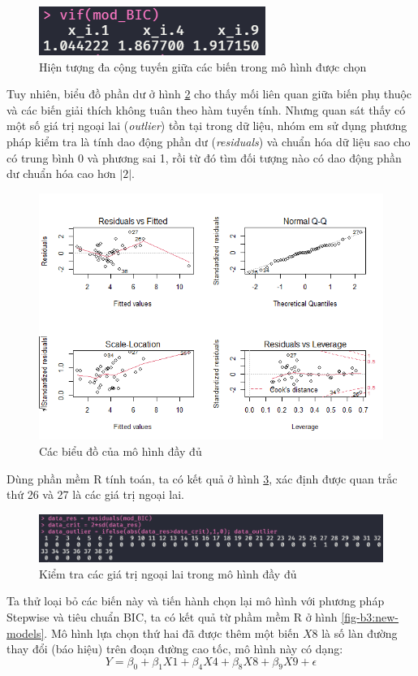 \begin{figure}[H]
	\centering
	\includegraphics[width=0.35\linewidth]{images/B3/model-bic-vif}
	\caption{Hiện tượng đa cộng tuyến giữa các biến trong mô hình được chọn}
	\label{fig-b3:model-bic-vif}
\end{figure}

Tuy nhiên, biểu đồ phần dư ở hình \ref{fig-b3:model-full-plot} cho thấy mối liên quan giữa biến phụ thuộc và các biến giải thích không tuân theo hàm tuyến tính. Nhưng quan sát thấy có một số giá trị ngoại lai (\textit{outlier}) tồn tại trong dữ liệu, nhóm em sử dụng phương pháp kiểm tra là tính dao động phần dư (\textit{residuals}) và chuẩn hóa dữ liệu sao cho có trung bình 0 và phương sai 1, rồi từ đó tìm đối tượng nào có dao động phần dư chuẩn hóa cao hơn $|2|$. 
\begin{figure}[H]
	\centering
	\includegraphics[width=0.65\linewidth]{images/B3/model-full-plot}
	\caption{Các biểu đồ của mô hình đầy đủ}
	\label{fig-b3:model-full-plot}
\end{figure}

Dùng phần mềm R tính toán, ta có kết quả ở hình \ref{fig-b3:dataset-outlier}, xác định được quan trắc thứ 26 và 27 là các giá trị ngoại lai.
\begin{figure}[H]
	\centering
	\includegraphics[width=0.7\linewidth]{images/B3/dataset-outlier}
	\caption{Kiểm tra các giá trị ngoại lai trong mô hình đầy đủ}
	\label{fig-b3:dataset-outlier}
\end{figure}

Ta thử loại bỏ các biến này và tiến hành chọn lại mô hình với phương pháp Stepwise và tiêu chuẩn BIC, ta có kết quả từ phầm mềm R ở hình \ref{fig-b3:new-models}. Mô hình lựa chọn thứ hai đã được thêm một biến $X8$ là số làn đường thay đổi (báo hiệu) trên đoạn đường cao tốc, mô hình này có dạng:
\begin{equation}\label{b3-new-model-bic}
	Y = \beta_0 + \beta_1X1 + \beta_4X4 + \beta_8X8 + \beta_9X9 + \epsilon
\end{equation}

